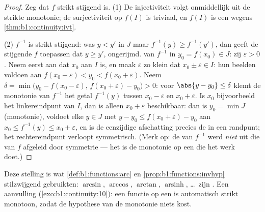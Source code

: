 \begin{proof}
Zeg dat $f$ strikt stijgend is. (1) De injectiviteit volgt onmiddellijk
uit de strikte monotonie; de surjectiviteit op $f(I)$ is triviaal, en
$f(I)$ is een  wegens \cref{thm:b1:continuity:ivt}.

(2) $f^{-1}$ is strikt stijgend: was $y < y'$ in $J$ maar $f^{-1}(y) \geq
f^{-1}(y')$, dan geeft de stijgende $f$ toepassen dat $y \geq y'$,
ongerijmd.  van $f^{-1}$ in $y_0 = f(x_0) \in J$: zij
$\varepsilon > 0$. Neem eerst aan dat $x_0$  aan $I$ is, en maak
$\varepsilon$ zo klein dat $x_0 \pm \varepsilon \in I$: hun beelden
voldoen aan $f(x_0 - \varepsilon) < y_0 < f(x_0 + \varepsilon)$. Neem
$\delta = \min\bigl(y_0 - f(x_0 - \varepsilon),\, f(x_0 + \varepsilon) -
y_0\bigr) > 0$: voor $\abs{y - y_0} \leq \delta$ klemt de monotonie van
$f^{-1}$ het getal $f^{-1}(y)$ tussen $x_0 - \varepsilon$ en $x_0 +
\varepsilon$. Is $x_0$ bijvoorbeeld het linkereindpunt van $I$, dan is
alleen $x_0 + \varepsilon$ beschikbaar: dan is $y_0 = \min J$
(monotonie), voldoet elke $y \in J$ met $y - y_0 \leq f(x_0 +
\varepsilon) - y_0$ aan $x_0 \leq f^{-1}(y) \leq x_0 + \varepsilon$, en
is de eenzijdige afschatting precies de  in een randpunt; het
rechtereindpunt verloopt symmetrisch. (Merk op: de  van
$f^{-1}$ werd \emph{niet} uit die van $f$ afgeleid door symmetrie --- het
is de monotonie op een  die het werk doet.)
\end{proof}

\begin{remark}
Deze stelling is wat \cref{def:b1:functions:arc} en
\cref{prop:b1:functions:invhyp} stilzwijgend gebruikten: $\arcsin$,
$\arccos$, $\arctan$, $\operatorname{arsinh}$, \dots\ zijn . Een
aanvulling (\cref{exo:b1:continuity:10}): een 
\emph{} functie op een  is automatisch strikt monotoon,
zodat de hypothese van de monotonie niets kost.
\end{remark}

